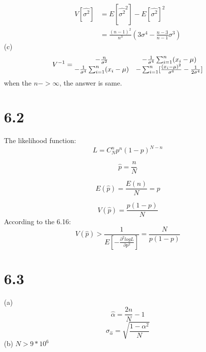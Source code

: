 \documentclass{article}
\begin{document}
\begin{CJK*}{GBK}{song}
\begin{equation}
\end{equation}
\begin{equation}
\begin{aligned}
V[\hat{\sigma^2}]&=E[\hat{\sigma^2}^2]-E[\hat{\sigma^2}]^2\\
&=\frac{(n-1)^2}{n^3}(3\sigma^4-\frac{n-3}{n-1}\sigma^3)
\end{aligned}
\end{equation}
(c)
\begin{equation}
V^{-1}=
  \begin{matrix}
   $$-\frac{n}{\sigma^2}$$ & $$-\frac{1}{\sigma^4}\sum_{i=1}^{n}(x_i-\mu)$$ \\
   $$-\frac{1}{\sigma^4}\sum_{i=1}^{n}(x_i-\mu)$$ & $$-\sum_{i=1}^{n}[\frac{(x_i-\mu)^2}{\sigma^6}-\frac{1}{2\sigma^4}]$$
  \end{matrix} 
  \end{equation}
  when the $n->\infty$, the answer is same.
  
  
\section{6.2}
The likelihood function:
\begin{equation}
L=C_N^np^n(1-p)^{N-n}
\end{equation}

\begin{equation}
\hat{p}=\frac{n}{N}
\end{equation}

\begin{equation}
E(\hat{p})=\frac{E(n)}{N}=p
\end{equation}

\begin{equation}
V(\hat{p})=\frac{p(1-p)}{N}
\end{equation}
According to the 6.16:
\begin{equation}
V(\hat{p})>\frac{1}{E[-\frac{\partial^2logL}{\partial p^2}]}=\frac{N}{p(1-p)}
\end{equation}

\section{6.3}
(a)
\begin{equation}
\hat{\alpha}=\frac{2n}{N}-1
\end{equation}
\begin{equation}
\sigma_{\hat{\alpha}}=\sqrt{\frac{1-\alpha^2}{N}}
\end{equation}
 (b)
 $N>9*10^6$
 

\end{CJK*}
\end{document}
